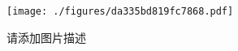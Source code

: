 
\begin{figure}[ht]
\centering
\texttt{[image: ./figures/da335bd819fc7868.pdf]}
\caption{请添加图片描述} \label{fig_svgtst_1}
\end{figure}


